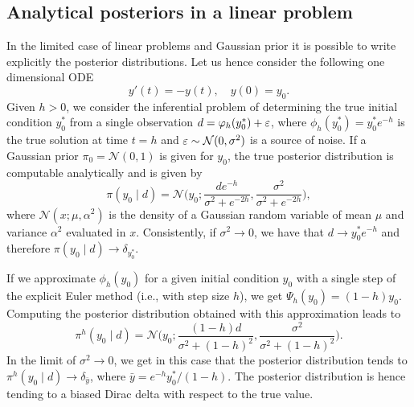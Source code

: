 \documentclass[final,onefignum,onetabnum]{siamonline171218}
\begin{document}
\subsection{Analytical posteriors in a linear problem}\label{sec:AnalyticalPosterior} In the limited case of linear problems and Gaussian prior it is possible to write explicitly the posterior distributions. Let us hence consider the following one dimensional ODE
\begin{equation}
	y'(t) = -y(t), \quad y(0) = y_0.
\end{equation}
Given $h > 0$, we consider the inferential problem of determining the true initial condition $y_0^*$ from a single observation $d = \varphi_h(y_0^*) + \varepsilon$, where $\phi_h(y_0^*) = y_0^*e^{-h}$ is the true solution at time $t =  h$ and $\varepsilon \sim \mathcal N (0, \sigma^2)$ is a source of noise. If a Gaussian prior $\pi_0 = \mathcal N(0, 1)$ is given for $y_0$, the true posterior distribution is computable analytically and is given by
\begin{equation}\label{eq:ExPosteriorEx}
	\pi(y_0 \mid d) = \mathcal N\Big(y_0; \frac{de^{-h}}{\sigma^2 + e^{-2h}}, \frac{\sigma^2}{\sigma^2 + e^{-2h}}\Big),
\end{equation}
where $\mathcal N(x; \mu, \alpha^2)$ is the density of a Gaussian random variable of mean $\mu$ and variance $\alpha^2$ evaluated in $x$. Consistently, if $\sigma^2 \to 0$, we have that $d \to y_0^*e^{-h}$ and therefore $\pi(y_0 \mid d) \to \delta_{y_0^*}$. 

If we approximate $\phi_h(y_0)$ for a given initial condition $y_0$ with a single step of the explicit Euler method (i.e., with step size $h$), we get $\Psi_h(y_0) = (1 - h)y_0$. Computing the posterior distribution obtained with this approximation leads to 
\begin{equation}\label{eq:ExPosteriorRK}
\pi^h(y_0 \mid d) = \mathcal N\Big(y_0; \frac{(1 - h)d}{\sigma^2 + (1- h)^2}, \frac{\sigma^2}{\sigma^2 + (1 - h)^2}\Big).
\end{equation}
In the limit of $\sigma^2 \to 0$, we get in this case that the posterior distribution tends to $\pi^h(y_0 \mid d) \to \delta_{\bar y}$, where $\bar y = e^{-h}y_0^* / (1 - h)$. The posterior distribution is hence tending to a biased Dirac delta with respect to the true value.
\end{document}
